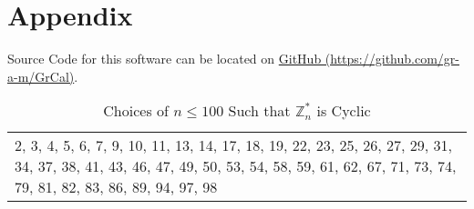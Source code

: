 \documentclass[11pt,a4paper]{article}
\theoremstyle{definition}
\begin{document}
\pagebreak

\section{Appendix}

\noindent Source Code for this software can be located on \href{https://github.com/gr-a-m/GrCal}{GitHub (https://github.com/gr-a-m/GrCal)}.

\begin{center}
\begin{table}[h]
\caption{Choices of $n \leq 100$ Such that $\mathbb{Z}_n^\ast$ is Cyclic}
\begin{tabular}{p{15cm}}
\hline 2, 3, 4, 5, 6, 7, 9, 10, 11, 13, 14, 17, 18, 19, 22, 23, 25, 26, 27, 29, 31, 34, 37, 38, 41, 43, 46, 47, 49, 50, 53, 54, 58, 59, 61, 62, 67, 71, 73, 74, 79, 81, 82, 83, 86, 89, 94, 97, 98
\end{tabular}
\end{table}
\end{center}
\end{document}
